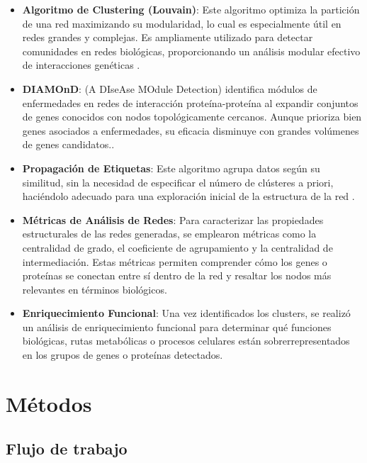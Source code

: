 \begin{itemize}
	\item \textbf{Algoritmo de Clustering (Louvain)}: Este algoritmo optimiza la partición de una red maximizando su modularidad, lo cual es especialmente útil en redes grandes y complejas. Es ampliamente utilizado para detectar comunidades en redes biológicas, proporcionando un análisis modular efectivo de interacciones genéticas \cite{Blondel2008}.
	
	\item \textbf{DIAMOnD}: (A DIseAse MOdule Detection) identifica módulos de enfermedades en redes de interacción proteína-proteína al expandir conjuntos de genes conocidos con nodos topológicamente cercanos. Aunque prioriza bien genes asociados a enfermedades, su eficacia disminuye con grandes volúmenes de genes candidatos.\cite{Ghiassian2015}.
	
	\item \textbf{Propagación de Etiquetas}: Este algoritmo agrupa datos según su similitud, sin la necesidad de especificar el número de clústeres a priori, haciéndolo adecuado para una exploración inicial de la estructura de la red \cite{Raghavan2007}.
	
	\item \textbf{Métricas de Análisis de Redes}: Para caracterizar las propiedades estructurales de las redes generadas, se emplearon métricas como la centralidad de grado, el coeficiente de agrupamiento y la centralidad de intermediación. Estas métricas permiten comprender cómo los genes o proteínas se conectan entre sí dentro de la red y resaltar los nodos más relevantes en términos biológicos.
	
	\item \textbf{Enriquecimiento Funcional}: Una vez identificados los clusters, se realizó un análisis de enriquecimiento funcional para determinar qué funciones biológicas, rutas metabólicas o procesos celulares están sobrerrepresentados en los grupos de genes o proteínas detectados. 
\end{itemize}



\section{Métodos}

\subsection{Flujo de trabajo}

